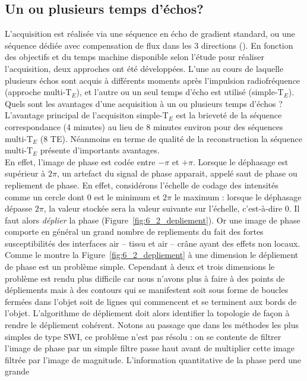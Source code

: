 \subsection{Un ou plusieurs temps d'échos?}
L’acquisition est réalisée via une séquence en écho de gradient standard, ou une séquence
dédiée avec compensation de flux dans les 3 directions ({\cite{Deistung2009}). En fonction des objectifs et du temps
machine disponible selon l’étude pour réaliser l’acquisition, deux approches ont été développées.
L’une au cours de laquelle plusieurs échos sont acquis à différents moments après l’impulsion
radiofréquence (approche multi-T$_E$), et l’autre ou un seul temps d’écho est utilisé (simple-T$_E$).\\
Quels sont les avantages d’une acquisition à un ou plusieurs temps d’échos ?\\
L’avantage principal de l’acquisiton simple-T$_E$ est la brieveté de la séquence correspondance (4
minutes) au lieu de 8 minutes environ pour des séquences multi-T$_E$ (8 TE). Néanmoins en terme de
qualité de la reconstruction la séquence multi-T$_E$ présente d’importants avantages.\\
En effet, l’image de phase est codée entre $-\pi$ et $+\pi$. Lorsque le déphasage est supérieur à $2\pi$,
un artefact du signal de phase apparait, appelé saut de phase ou repliement de phase. En effet,
considérons l’échelle de codage des intensités comme un cercle dont $0$ est le minimum et $2\pi$ le
maximum : lorsque le déphasage dépasse $2\pi$, la valeur stockée sera la valeur suivante sur l’échelle,
c’est-à-dire $0$. Il faut alors {\em déplier} la phase (Figure~\ref{fig:6_2_depliement}). Or une image de phase comporte en général un grand nombre de repliements du fait des fortes susceptibilités des interfaces air – tissu et air – crâne
ayant des effets non locaux. Comme le montre la Figure~\ref{fig:6_2_depliement} à une dimension le dépliement de phase
est un problème simple. Cependant à deux et trois dimensions le problème est rendu plus difficile car
nous n’avons plus à faire à des points de dépliements mais à des contours qui se manifestent soit sous
forme de boucles fermées dans l’objet soit de lignes qui commencent et se terminent aux bords de
l’objet. L’algorithme de dépliement doit alors identifier la topologie de façon à rendre le dépliement
cohérent. Notons au passage que dans les méthodes les plus simples de type SWI, ce problème n’est
pas résolu : on se contente de filtrer l’image de phase par un simple filtre passe haut avant de multiplier
cette image filtrée par l’image de magnitude. L’information quantitative de la phase perd une grande
}
